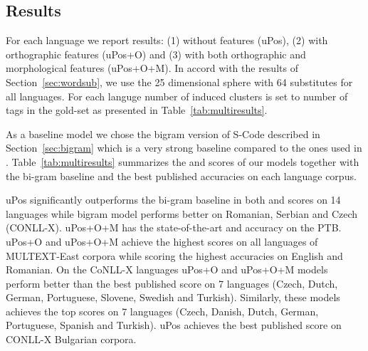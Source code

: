 \subsection{Results}
\label{sec:multires}

For each language we report results: (1) without features (uPos), (2)
with orthographic features (uPos+O) and (3) with both orthographic and
morphological features (uPos+O+M).  In accord with the results of
Section~\ref{sec:wordsub}, we use the 25 dimensional sphere with 64
substitutes for all languages.  For each languge number of induced
clusters is set to number of tags in the gold-set as presented in
Table~\ref{tab:multiresults}.

As a baseline model we chose the bigram version of S-Code described in
Section~\ref{sec:bigram} which is a very strong baseline compared to
the ones used in
\cite{christodoulopoulos-goldwater-steedman:2011:EMNLP}.
Table~\ref{tab:multiresults} summarizes the \mto and \vm scores of our
models together with the bi-gram baseline and the best published
accuracies on each language corpus.
 

uPos significantly outperforms the bi-gram baseline in both \mto and
\vm scores on 14 languages while bigram model performs better on
Romanian, Serbian and Czech (CONLL-X).  uPos+O+M has the
state-of-the-art \mto and \vm accuracy on the PTB.  uPos+O and
uPos+O+M achieve the highest \mto scores on all languages of
MULTEXT-East corpora while scoring the highest \vm accuracies on
English and Romanian.  On the CoNLL-X languages uPos+O and uPos+O+M
models perform better than the best published \mto score on 7
languages (Czech, Dutch, German, Portuguese, Slovene, Swedish and
Turkish).  Similarly, these models achieves the top \vm scores on 7
languages (Czech, Danish, Dutch, German, Portuguese, Spanish and
Turkish).  uPos achieves the best published \mto score on CONLL-X
Bulgarian corpora.

